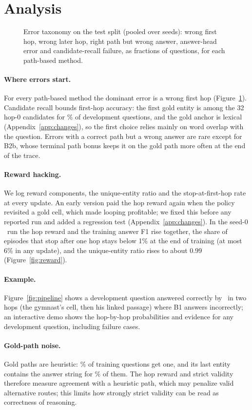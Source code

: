 \section{Analysis}
\label{sec:analysis}

\begin{figure}[t]
\centering
{}
\caption{Error taxonomy on the test split (pooled over seeds): wrong first hop, wrong later hop, right path but wrong answer, answer-head error and candidate-recall failure, as fractions of questions, for each path-based method.}
\label{fig:errors}
\end{figure}

\paragraph{Where errors start.}
For every path-based method the dominant error is a wrong first hop (Figure~\ref{fig:errors}). Candidate recall bounds first-hop accuracy: the first gold entity is among the 32 hop-0 candidates for \RecallKDev\% of development questions, and the gold anchor is lexical (Appendix~\ref{app:changes}), so the first choice relies mainly on word overlap with the question. Errors with a correct path but a wrong answer are rare except for B2b, whose terminal path bonus keeps it on the gold path more often at the end of the trace.

\paragraph{Reward hacking.}
We log reward components, the unique-entity ratio and the stop-at-first-hop rate at every update. An early version paid the hop reward again when the policy revisited a gold cell, which made looping profitable; we fixed this before any reported run and added a regression test (Appendix~\ref{app:changes}). In the seed-0 \hop\ run the hop reward and the training answer F1 rise together, the share of episodes that stop after one hop stays below 1\% at the end of training (at most 6\% in any update), and the unique-entity ratio rises to about 0.99 (Figure~\ref{fig:reward}).

\paragraph{Example.}
Figure~\ref{fig:pipeline} shows a development question answered correctly by \hop\ in two hops (the gymnast's cell, then his linked passage) where B1 answers incorrectly; an interactive demo shows the hop-by-hop probabilities and evidence for any development question, including failure cases.

\paragraph{Gold-path noise.}
Gold paths are heuristic: \GoldCovTrain\% of training questions get one, and its last entity contains the answer string for \LastEntAnsTrain\% of them. The hop reward and strict validity therefore measure agreement with a heuristic path, which may penalize valid alternative routes; this limits how strongly strict validity can be read as correctness of reasoning.
